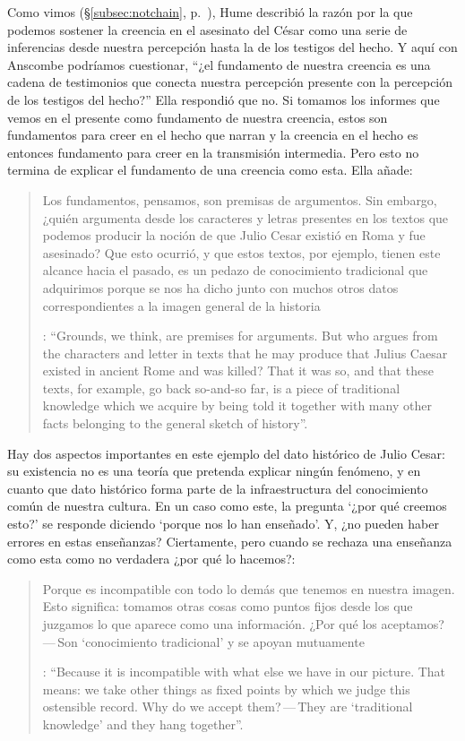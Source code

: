 Como vimos (\S\ref{subsec:notchain}, p.~\pageref{subsec:notchain}), Hume describió la razón por la que podemos sostener la creencia en el asesinato del César como una serie de inferencias desde nuestra percepción hasta la de los testigos del hecho.
Y aquí con Anscombe podríamos cuestionar, \enquote{¿el fundamento de nuestra creencia es una cadena de testimonios que conecta nuestra percepción presente con la percepción de los testigos del hecho?} Ella respondió que no. Si tomamos los informes que vemos en el presente como fundamento de nuestra creencia, estos son fundamentos para creer en el hecho que narran y la creencia en el hecho es entonces fundamento para creer en la transmisión intermedia. Pero esto no termina de explicar el fundamento de una creencia como esta. Ella añade: \blockquote[{\Cite[182]{anscombe2015logic:grounds}}: \enquote{Grounds, we think, are premises for arguments. But who argues from the characters and letter in texts that he may produce that Julius Caesar existed in ancient Rome and was killed? That it was so, and that these texts, for example, go back so-and-so far, is a piece of traditional knowledge which we acquire by being told it together with many other facts belonging to the general sketch of history}.]{Los fundamentos, pensamos, son premisas de argumentos. Sin embargo, ¿quién argumenta desde los caracteres y letras presentes en los textos que podemos producir la noción de que Julio Cesar existió en Roma y fue asesinado? Que esto ocurrió, y que estos textos, por ejemplo, tienen este alcance hacia el pasado, es un pedazo de conocimiento tradicional que adquirimos porque se nos ha dicho junto con muchos otros datos correspondientes a la imagen general de la historia}. Hay dos aspectos importantes en este ejemplo del dato histórico de Julio Cesar: su existencia no es una teoría que pretenda explicar ningún fenómeno, y en cuanto que dato histórico forma parte de la infraestructura del conocimiento común de nuestra cultura. En un caso como este, la pregunta \enquote*{¿por qué creemos esto?} se responde diciendo \enquote*{porque nos lo han enseñado}. Y, ¿no pueden haber errores en estas enseñanzas? Ciertamente, pero cuando se rechaza una enseñanza como esta como no verdadera ¿por qué lo hacemos?: \blockquote[{\Cite[182]{anscombe2015logic:grounds}}: \enquote{Because it is incompatible with what else we have in our picture. That means: we take other things as fixed points by which we judge this ostensible record. Why do we accept them?\,---\,They are `traditional knowledge' and they hang together}.]{Porque es incompatible con todo lo demás que tenemos en nuestra imagen. Esto significa: tomamos otras cosas como puntos fijos desde los que juzgamos lo que aparece como una información. ¿Por qué los aceptamos?\,---\,Son `conocimiento tradicional' y se apoyan mutuamente}.

